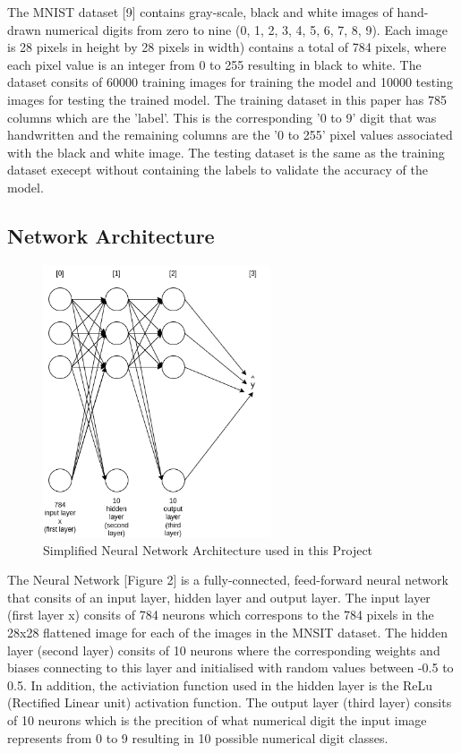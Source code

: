 \documentclass[11pt]{article}
\begin{document}
The MNIST dataset [9] contains gray-scale, black and white images of hand-drawn numerical digits from zero to nine (0, 1, 2, 3, 4, 5, 6, 7, 8, 9). Each image is 28 pixels in height by 28 pixels in width) contains a total of 784 pixels, where each pixel value is an integer from 0 to 255 resulting in black to white. The dataset consits of 60000 training images for training the model and 10000 testing images for testing the trained model. The training dataset in this paper has 785 columns which are the 'label'. This is the corresponding '0 to 9' digit that was handwritten and the remaining columns are the '0 to 255' pixel values associated with the black and white image. The testing dataset is the same as the training dataset execept without containing the labels to validate the accuracy of the model.


\subsection{Network Architecture}
\begin{figure}[H]
  \centering
  \includegraphics[width=0.6\textwidth]{Neural Network.drawio.png}
  \caption{Simplified Neural Network Architecture used in this Project}
  \label{fig:mnist}
\end{figure}

The Neural Network [Figure 2] is a fully-connected, feed-forward neural network that consits of an input layer, hidden layer and output layer. The input layer (first layer x) consits of 784 neurons which correspons to the 784 pixels in the 28x28 flattened image for each of the images in the MNSIT dataset. The hidden layer (second layer) consits of 10 neurons where the corresponding weights and biases connecting to this layer and initialised with random values between -0.5 to 0.5. In addition, the activiation function used in the hidden layer is the ReLu (Rectified Linear unit) activation function. The output layer (third layer) consits of 10 neurons which is the precition of what numerical digit the input image represents from 0 to 9 resulting in 10 possible numerical digit classes.
\end{document}
